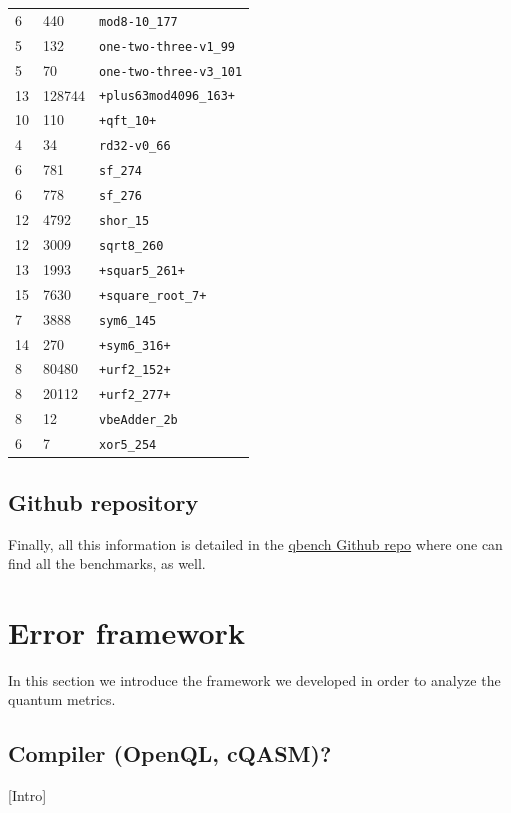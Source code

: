 \begin{table}[htbp]
\begin{tabular}{lll}
6 & 440 & \texttt{mod8-10\_177}\\
5 & 132 & \texttt{one-two-three-v1\_99}\\
5 & 70 & \texttt{one-two-three-v3\_101}\\
13 & 128744 & \texttt{+plus63mod4096\_163+}\\
10 & 110 & \texttt{+qft\_10+}\\
4 & 34 & \texttt{rd32-v0\_66}\\
6 & 781 & \texttt{sf\_274}\\
6 & 778 & \texttt{sf\_276}\\
12 & 4792 & \texttt{shor\_15}\\
12 & 3009 & \texttt{sqrt8\_260}\\
13 & 1993 & \texttt{+squar5\_261+}\\
15 & 7630 & \texttt{+square\_root\_7+}\\
7 & 3888 & \texttt{sym6\_145}\\
14 & 270 & \texttt{+sym6\_316+}\\
8 & 80480 & \texttt{+urf2\_152+}\\
8 & 20112 & \texttt{+urf2\_277+}\\
8 & 12 & \texttt{vbeAdder\_2b}\\
6 & 7 & \texttt{xor5\_254}\\
\hline
\end{tabular}
\end{table}



\subsection*{Github repository}
\label{sec:orgab55333}

Finally, all this information is detailed in the \href{https://github.com/QE-Lab/qbench}{qbench Github repo} where one can find all the benchmarks, as well.

\section*{Error framework}
\label{sec:org0f2eac3}
In this section we introduce the framework we developed in order to analyze the quantum metrics.

\subsection*{Compiler (OpenQL, cQASM)?}
\label{sec:orga7fd2a0}
[Intro]


